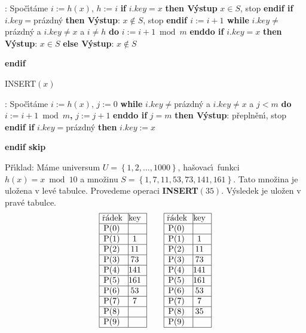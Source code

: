 :\newline 
Spo\v c\'\i t\'ame $i:=h\left(x\right)$, $h:=i$\newline 
{\bf if} $i.key=x$ {\bf then V\'ystup} $x\in S$, stop {\bf endif\newline 
if} $i.key=$pr\'azdn\'y {\bf then {{\rm V\'ystup}}}: $x\notin S$, stop {\bf endif\newline 
$i:=i+1$\newline 
while} $i.key\ne$pr\'azdn\'y a $i.key\ne x$ a $i\ne h$ {\bf do} $
i:=i+1\bmod m$ {\bf enddo\newline 
if} $i.key=x$ {\bf then V\'ystup}: $x\in S$ {\bf else V\'ystup}: $
x\notin S$ {\bf endif
\medskip

\flushpar INSERT$\left(x\right)$}:\newline 
Spo\v c\'\i t\'ame $i:=h\left(x\right)$, $j:=0$\newline 
{\bf while} $i.key\ne$pr\'azdn\'y a $i.key\ne x$ a $j<m$ {\bf do} $
i:=i+1\bmod m${\bf ,} $j:=j+1$ {\bf enddo\newline 
if} $j=m$ {\bf then V\'ystup}: p\v repln\v en\'\i , stop {\bf endif\newline 
if} $i.key=$pr\'azdn\'y {\bf then} $i.key:=x$ {\bf endif
skip

}\flushpar P\v r\'\i klad: M\'ame universum $U=\left\{1,2,\dots,1000\right\}$, 
ha\v sovac\'\i\ funk\-ci $h\left(x\right)=x\bmod10$ a mno\v zinu  
$S=\left\{1,7,11,53,73,141,161\right\}$. Tato mno\v zina je ulo\v zena v lev\'e tabulce. 
Provedeme operaci {\bf INSERT$\left(35\right)$}. V\'ysledek je ulo\v zen v 
prav\'e tabulce.
$$\vbox {\hbox{\vtop{\offinterlineskip\halign{\strut\vrule\ # & \vrule\hfil# \hfil\vrule\cr\noalign{\hrule}\v r\'adek & key \hfil\cr\noalign{\hrule}P(0) & \hfill \cr\noalign{\hrule}P(1) & 1 \cr\noalign{\hrule}P(2) & 11 \cr\noalign{\hrule}P(3) & 73 \cr\noalign{\hrule}P(4) & 141 \cr\noalign{\hrule}P(5) & 161 \cr\noalign{\hrule}P(6) & 53 \cr\noalign{\hrule}P(7) & 7 \cr\noalign{\hrule}P(8) & \hfill\cr\noalign{\hrule}P(9) & \hfill \cr\noalign{\hrule}}}\qquad\vtop{\offinterlineskip\halign {\strut\vrule\ # & \vrule \hfil # \hfil \vrule\cr\noalign{\hrule}\v r\'adek & key \hfil \cr\noalign{\hrule}P(0) & \hfill \cr\noalign{\hrule}P(1) & 1 \cr\noalign{\hrule}P(2) & 11 \cr\noalign{\hrule}P(3) & 73 \cr\noalign{\hrule}P(4) & 141 \cr\noalign{\hrule}P(5) & 161 \cr\noalign{\hrule}P(6) & 53 \cr\noalign{\hrule}P(7) & 7 \cr\noalign{\hrule}P(8) & 35  \cr\noalign{\hrule}P(9) & \hfill \cr\noalign{\hrule}}}}}$$

